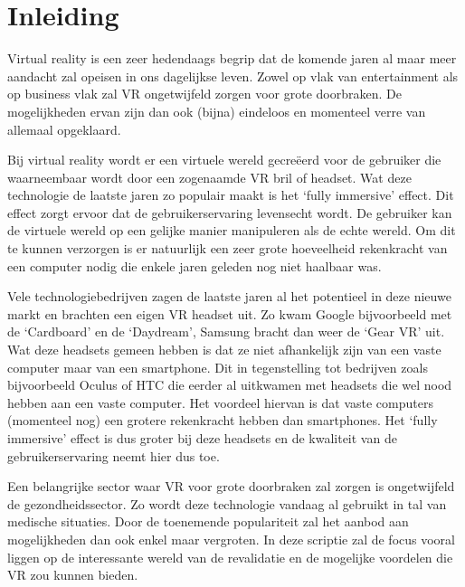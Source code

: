 
\chapter{Inleiding}
\label{ch:inleiding}

Virtual reality is een zeer hedendaags begrip dat de komende jaren al maar meer aandacht zal opeisen in ons dagelijkse leven. Zowel op vlak van entertainment als op business vlak zal VR ongetwijfeld zorgen voor grote doorbraken. De mogelijkheden ervan zijn dan ook (bijna) eindeloos en momenteel verre van allemaal opgeklaard.

Bij virtual reality wordt er een virtuele wereld gecreëerd voor de gebruiker die waarneembaar wordt door een zogenaamde VR bril of headset. Wat deze technologie de laatste jaren zo populair maakt is het ‘fully immersive’ effect. Dit effect zorgt ervoor dat de gebruikerservaring levensecht wordt. De gebruiker kan de virtuele wereld op een gelijke manier manipuleren als de echte wereld. Om dit te kunnen verzorgen is er natuurlijk een zeer grote hoeveelheid rekenkracht van een computer nodig die enkele jaren geleden nog niet haalbaar was.

Vele technologiebedrijven zagen de laatste jaren al het potentieel in deze nieuwe markt en brachten  een eigen VR headset uit. Zo kwam Google bijvoorbeeld met de ‘Cardboard’ en de ‘Daydream’, Samsung bracht dan weer de ‘Gear VR’ uit. Wat deze headsets gemeen hebben is dat ze niet afhankelijk zijn van een vaste computer maar van een smartphone. Dit in tegenstelling tot bedrijven zoals bijvoorbeeld Oculus of HTC die eerder al uitkwamen met headsets die wel nood hebben aan een vaste computer. Het voordeel hiervan is dat vaste computers (momenteel nog) een grotere rekenkracht hebben dan smartphones. Het ‘fully immersive’ effect is dus groter bij deze headsets en de kwaliteit van de gebruikerservaring neemt hier dus toe. 

Een belangrijke sector waar VR voor grote doorbraken zal zorgen is ongetwijfeld de gezondheidssector. Zo wordt deze technologie vandaag al gebruikt in tal van medische situaties. Door de toenemende populariteit zal het aanbod aan mogelijkheden dan ook enkel maar vergroten. In deze scriptie zal de focus vooral liggen op de interessante wereld van de revalidatie en de mogelijke voordelen die VR zou kunnen bieden.


